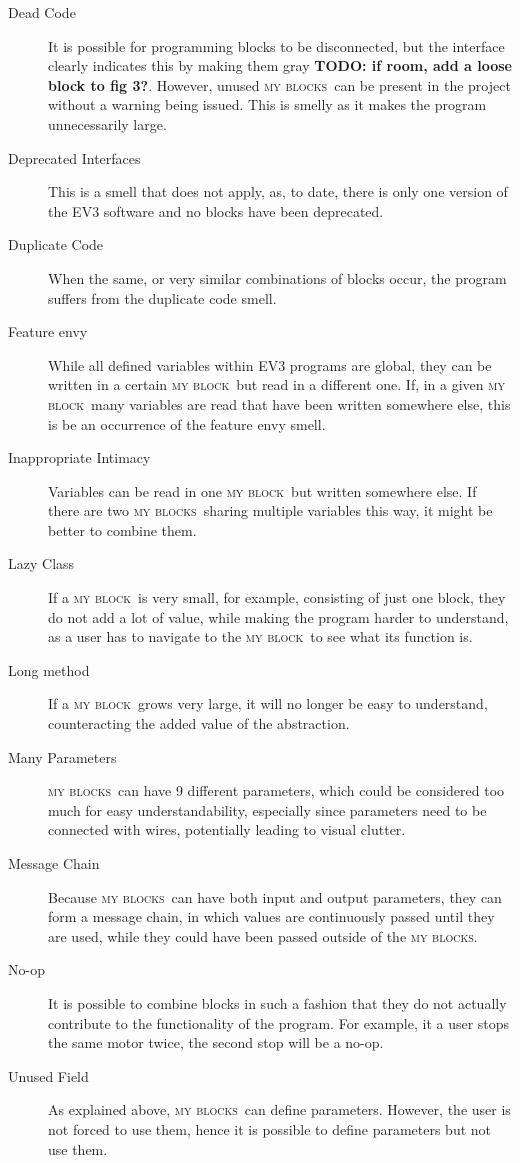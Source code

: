 \documentclass{sig-alternate}
\newcommand{\todo}[1]{\textbf{TODO: #1}}
\newcommand{\mbs}{\textsc{my blocks}}
\newcommand{\mb}{\textsc{my block}}
\begin{document}
\begin{description}
\item[Dead Code] It is possible for programming blocks to be disconnected, but the interface clearly indicates this by making them gray \todo{if room, add a loose block to fig 3?}. However, unused \mbs~can be present in the project without a warning being issued. This is smelly as it makes the program unnecessarily large.
\item[Deprecated Interfaces] This is a smell that does not apply, as, to date, there is only one version of the EV3 software and no blocks have been deprecated.
\item[Duplicate Code] When the same, or very similar combinations of blocks occur, the program suffers from the duplicate code smell.
\item[Feature envy] While all defined variables within EV3 programs are global, they can be written in a certain \mb~but read in a different one. If, in a given \mb~many variables are read that have been written somewhere else, this is be an occurrence of the feature envy smell. 
\item[Inappropriate Intimacy] Variables can be read in one \mb~but written somewhere else. If there are two \mbs~sharing multiple variables this way, it might be better to combine them.
\item[Lazy Class] If a \mb~is very small, for example, consisting of just one block, they do not add a lot of value, while making the program harder to understand, as a user has to navigate to the \mb~to see what its function is.
\item[Long method] If a \mb~grows very large, it will no longer be easy to understand, counteracting the added value of the abstraction.
\item[Many Parameters] \mbs~can have 9 different parameters, which could be considered too much for easy understandability, especially since parameters need to be connected with wires, potentially leading to visual clutter.
\item[Message Chain] Because \mbs~can have both input and output parameters, they can form a message chain, in which values are continuously passed until they are used, while they could have been passed outside of the \mbs.
\item[No-op] It is possible to combine blocks in such a fashion that they do not actually contribute to the functionality of the program. For example, it a user stops the same motor twice, the second stop will be a no-op.
\item[Unused Field] As explained above, \mbs~can define parameters. However, the user is not forced to use them, hence it is possible to define parameters but not use them.

\end{description}
\end{document}
